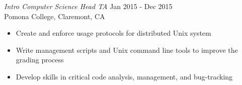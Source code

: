 {\sl Intro Computer Science Head TA} \hfill Jan 2015 - Dec 2015 \\
Pomona College, Claremont, CA
\begin{itemize} \itemsep -2pt %
\item Create and enforce usage protocols for distributed Unix system
\item Write management scripts and Unix command line tools to improve the grading process
\item Develop skills in critical code analysis, management, and bug-tracking
\end{itemize}
